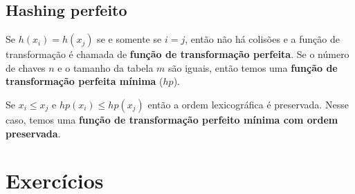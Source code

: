 \subsection{Hashing perfeito}

Se $h(x_i) = h(x_j)$ se e somente se $i = j$, então não há colisões e a 
função de transformação é chamada de {\bf função de transformação perfeita}.
Se o número de chaves $n$ e o tamanho da tabela $m$ são iguais, então temos uma
{\bf função de transformação perfeita mínima} ($hp$).

Se $x_i \leq x_j$ e $hp(x_i) \leq hp(x_j)$ então a ordem lexicográfica é preservada. 
Nesse caso, temos uma {\bf função de transformação perfeito mínima com ordem preservada}.

\section{Exercícios}

